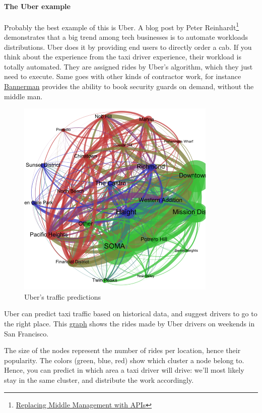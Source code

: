 \documentclass[12pt]{article}
\begin{document}
\paragraph{The Uber example}

Probably the best example of this is Uber. A blog post by Peter
Reinhardt\footnote{\href{http://rein.pk/replacing-middle-management-with-apis/}
{Replacing Middle Management with APIs}} demonstrates that a big trend among
tech businesses is to automate workloads distributions. Uber does it by
providing end users to directly order a cab. If you think about the experience
from the taxi driver experience, their workload is totally automated. They are
assigned rides by Uber's algorithm, which they just need to execute. Same goes
with other kinds of contractor work, for instance
\href{https://www.getbannerman.com/}{Bannerman} provides the ability to book
security guards on demand, without the middle man.


\begin{figure}[ht]
    \centering
    \includegraphics[scale=0.8]{uber-graph}
    \caption{Uber's traffic predictions}
    \label{fig:uber-graph}
\end{figure}

\smallskip

Uber can predict taxi traffic based on historical data, and suggest drivers to
go to the right place. This
\href{http://blogs.mathworks.com/loren/2014/09/06/analyzing-uber-ride-sharing-gps-data/}
{graph} shows the rides made by Uber drivers on weekends in San Francisco.

The size of the nodes represent the number of rides per location, hence their
popularity. The colors (green, blue, red) show which cluster a node belong to.
Hence, you can predict in which area a taxi driver will drive: we'll most likely
stay in the same cluster, and distribute the work accordingly.
\end{document}
